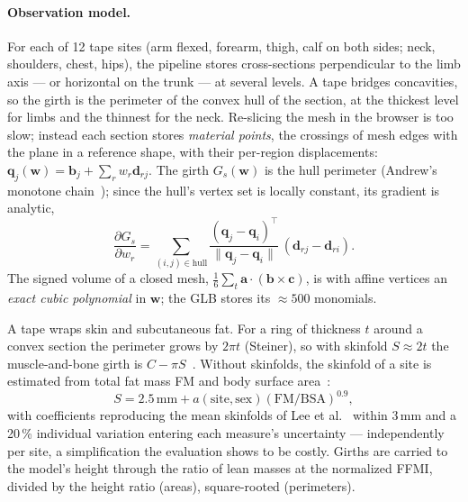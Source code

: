 \documentclass[10pt,twocolumn]{article}
\newcommand{\vect}[1]{\mathbf{#1}}
\begin{document}
\paragraph{Observation model.}
For each of 12 tape sites (arm flexed, forearm, thigh, calf on both sides; neck, shoulders, chest,
hips), the pipeline stores cross-sections perpendicular to the limb axis --- or horizontal on the
trunk --- at several levels. A tape bridges concavities, so the girth is the perimeter of the convex
hull of the section, at the thickest level for limbs and the thinnest for the neck. Re-slicing the
mesh in the browser is too slow; instead each section stores \emph{material points}, the crossings
of mesh edges with the plane in a reference shape, with their per-region displacements:
$\vect q_j(\vect w)=\vect b_j+\sum_r w_r\vect d_{rj}$. The girth $G_s(\vect w)$ is the hull perimeter
(Andrew's monotone chain~\cite{andrew1979hull}); since the hull's vertex set is locally constant, its
gradient is analytic,
\begin{equation}
\frac{\partial G_s}{\partial w_r}=\sum_{(i,j)\in\text{hull}}\frac{(\vect q_j-\vect q_i)^{\!\top}}{\|\vect q_j-\vect q_i\|}\,(\vect d_{rj}-\vect d_{ri}).
\end{equation}
The signed volume of a closed mesh, $\frac16\sum_t \vect a\cdot(\vect b\times\vect c)$, is with affine
vertices an \emph{exact cubic polynomial} in $\vect w$; the GLB stores its $\approx 500$ monomials.

A tape wraps skin and subcutaneous fat. For a ring of thickness $t$ around a convex section the
perimeter grows by $2\pi t$ (Steiner), so with skinfold $S\approx 2t$ the muscle-and-bone girth is
$C-\pi S$~\cite{heymsfield1982arm,lee2000anthropometric}. Without skinfolds, the skinfold of a site
is estimated from total fat mass FM and body surface area~\cite{mosteller1987bsa}:
\begin{equation}
S = 2.5\,\text{mm} + a(\text{site},\text{sex})\left(\mathrm{FM}/\mathrm{BSA}\right)^{0.9},
\end{equation}
with coefficients reproducing the mean skinfolds of Lee et al.~\cite{lee2000anthropometric} within
3\,mm and a 20\,\% individual variation entering each measure's uncertainty --- independently per
site, a simplification the evaluation shows to be costly. Girths are carried to the model's height
through the ratio of lean masses at the normalized FFMI, divided by the height ratio (areas),
square-rooted (perimeters).
\end{document}
